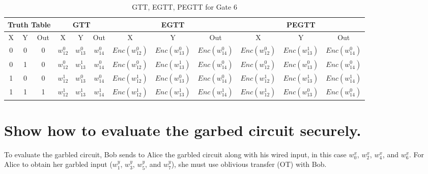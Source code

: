 \documentclass[times]{article}
\begin{document}
	\begin{table}
		\centering
		\caption{GTT, EGTT, PEGTT for Gate 6}
		\label{tab:gtt6}
		\begin{adjustbox}{width=1\textwidth}
		\begin{tabular}{|c|c|c||c|c|c||c|c|c||c|c|c|}
			\hline
			\multicolumn{3}{|c||}{Truth Table} 		& 
				\multicolumn{3}{|c||}{GTT}			& 
					\multicolumn{3}{|c||}{EGTT} 		& 
						\multicolumn{3}{|c|}{PEGTT} \\
			\hline
			\hline
			X & Y & Out	& 
				X & Y & Out	& 
					X & Y & Out	& 
						X & Y & Out	\\
			\hline
			0 & 0 & 0 	&
				$w_{12}^0$	& $w_{13}^0$	& $w_{14}^0$	& 
					$Enc(w_{12}^0)$	& $Enc(w_{13}^0)$	& $Enc(w_{14}^0)$ &
						$Enc(w_{12}^0)$	& $Enc(w_{13}^1)$	& $Enc(w_{14}^0)$ \\
			\hline
			0 & 1 & 0 	&
				$w_{12}^0$	& $w_{13}^1$	& $w_{14}^0$	& 
					$Enc(w_{12}^0)$	& $Enc(w_{13}^1)$	& $Enc(w_{14}^0)$ &
						$Enc(w_{12}^0)$	& $Enc(w_{13}^0)$	& $Enc(w_{14}^0)$ \\
			\hline
			1 & 0 & 0 	&
				$w_{12}^1$	& $w_{13}^0$	& $w_{14}^0$	& 
					$Enc(w_{12}^1)$	& $Enc(w_{13}^0)$	& $Enc(w_{14}^0)$ &
						$Enc(w_{12}^1)$	& $Enc(w_{13}^1)$	& $Enc(w_{14}^1)$ \\
			\hline
			1 & 1 & 1 	&
				$w_{12}^1$	& $w_{13}^1$	& $w_{14}^1$	& 
					$Enc(w_{12}^1)$	& $Enc(w_{13}^1)$	& $Enc(w_{14}^1)$ &
						$Enc(w_{12}^1)$	& $Enc(w_{13}^0)$	& $Enc(w_{14}^0)$ \\
			\hline
		\end{tabular}
		\end{adjustbox}
	\end{table}

	\section{Show how to evaluate the garbed circuit securely.}
	To evaluate the garbled circuit, Bob sends to Alice the garbled circuit along with his wired input, in this case $w_0^x$, $w_2^x$, $w_4^x$, and $w_6^x$. For Alice to obtain her garbled input ($w_1^y$, $w_3^y$, $w_5^y$, and $w_7^y$), she must use oblivious transfer (OT) with Bob.
	
	
		
\end{document}
